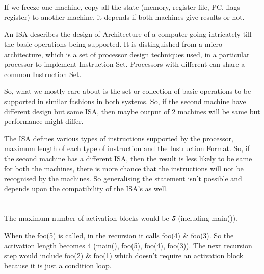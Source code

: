 \documentclass[12pt]{article}
\begin{document}
\maketitle


\section{}
If we freeze one machine, copy all the state (memory, register file, PC, flags register) to another machine, it depends if both machines give results or not.

An ISA describes the design of Architecture of a computer going intricately till the basic operations being supported. It is distinguished from a micro architecture, which is a set of processor design techniques used, in a particular processor to implement Instruction Set. Processors with different can share a common Instruction Set. 

So, what we mostly care about is the set or collection of basic operations to be supported in similar fashions in both systems. So, if the second machine have different design but same ISA, then maybe output of 2 machines will be same but performance might differ.

The ISA defines various types of instructions supported by the processor, maximum length of each type of instruction and the Instruction Format. So, if the second machine has a different ISA, then the result is less likely to be same for both the machines, there is more chance that the instructions will not be recognised by the machines. So generalising the statement isn't possible and depends upon the compatibility of the ISA's as well.


\section{}
The maximum number of activation blocks would be \textbf{\textit{5}} (including main()). 

When the foo(5) is called, in the recursion it calls foo(4) \& foo(3). So the activation length becomes 4 (main(), foo(5), foo(4), foo(3)). The next recursion step would include foo(2) \& foo(1) which doesn't require an activation block because it is just a condition loop. \\
\end{document}
